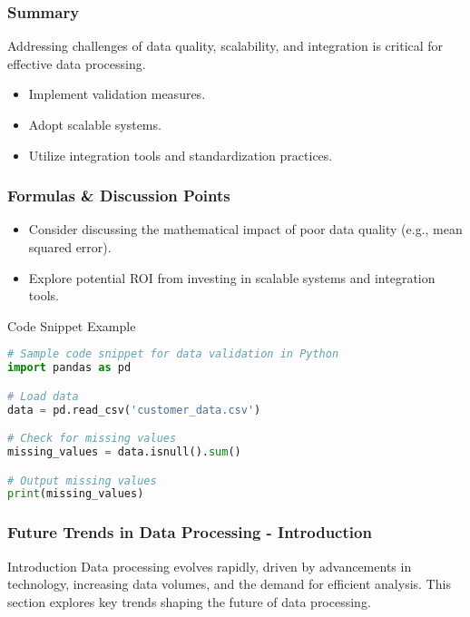 \documentclass[aspectratio=169]{beamer}
\begin{document}
\begin{frame}
    \frametitle{Summary}
    Addressing challenges of data quality, scalability, and integration is critical for effective data processing. 
    \begin{itemize}
        \item Implement validation measures.
        \item Adopt scalable systems.
        \item Utilize integration tools and standardization practices.
    \end{itemize}
\end{frame}

\begin{frame}[fragile]
    \frametitle{Formulas \& Discussion Points}
    \begin{itemize}
        \item Consider discussing the mathematical impact of poor data quality (e.g., mean squared error).
        \item Explore potential ROI from investing in scalable systems and integration tools.
    \end{itemize}
    \begin{block}{Code Snippet Example}
        \begin{lstlisting}[language=Python]
# Sample code snippet for data validation in Python
import pandas as pd

# Load data
data = pd.read_csv('customer_data.csv')

# Check for missing values
missing_values = data.isnull().sum()

# Output missing values
print(missing_values)
        \end{lstlisting}
    \end{block}
\end{frame}

\begin{frame}[fragile]
    \frametitle{Future Trends in Data Processing - Introduction}
    \begin{block}{Introduction}
        Data processing evolves rapidly, driven by advancements in technology, increasing data volumes, and the demand for efficient analysis.
        This section explores key trends shaping the future of data processing.
    \end{block}
\end{frame}
\end{document}

